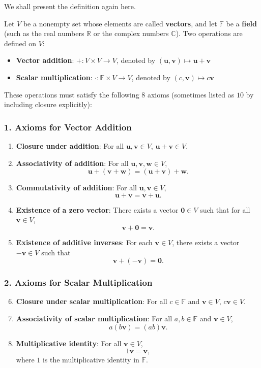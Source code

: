 We shall present the definition again here.

Let $V$ be a nonempty set whose elements are called \textbf{vectors}, and let $\mathbb{F}$ be a \textbf{field} (such as the real numbers $\mathbb{R}$ or the complex numbers $\mathbb{C}$). Two operations are defined on $V$:

\begin{itemize}
    \item \textbf{Vector addition}: $+ : V \times V \to V$, denoted by $(\mathbf{u}, \mathbf{v}) \mapsto \mathbf{u} + \mathbf{v}$
    \item \textbf{Scalar multiplication}: $\cdot : \mathbb{F} \times V \to V$, denoted by $(c, \mathbf{v}) \mapsto c \mathbf{v}$
\end{itemize}

These operations must satisfy the following $8$ axioms (sometimes listed as $10$ by including closure explicitly):

\subsubsection*{1. Axioms for Vector Addition}
\begin{enumerate}
    \item \textbf{Closure under addition}: For all $\mathbf{u}, \mathbf{v} \in V$, $\mathbf{u} + \mathbf{v} \in V$.
    \item \textbf{Associativity of addition}: For all $\mathbf{u}, \mathbf{v}, \mathbf{w} \in V$,
    \[
    \mathbf{u} + (\mathbf{v} + \mathbf{w}) = (\mathbf{u} + \mathbf{v}) + \mathbf{w}.
    \]
    \item \textbf{Commutativity of addition}: For all $\mathbf{u}, \mathbf{v} \in V$,
    \[
    \mathbf{u} + \mathbf{v} = \mathbf{v} + \mathbf{u}.
    \]
    \item \textbf{Existence of a zero vector}: There exists a vector $\mathbf{0} \in V$ such that for all $\mathbf{v} \in V$,
    \[
    \mathbf{v} + \mathbf{0} = \mathbf{v}.
    \]
    \item \textbf{Existence of additive inverses}: For each $\mathbf{v} \in V$, there exists a vector $-\mathbf{v} \in V$ such that
    \[
    \mathbf{v} + (-\mathbf{v}) = \mathbf{0}.
    \]
\end{enumerate}

\subsubsection*{2. Axioms for Scalar Multiplication}
\begin{enumerate}
    \setcounter{enumi}{5}
    \item \textbf{Closure under scalar multiplication}: For all $c \in \mathbb{F}$ and $\mathbf{v} \in V$, $c \mathbf{v} \in V$.
    \item \textbf{Associativity of scalar multiplication}: For all $a, b \in \mathbb{F}$ and $\mathbf{v} \in V$,
    \[
    a (b \mathbf{v}) = (ab) \mathbf{v}.
    \]
    \item \textbf{Multiplicative identity}: For all $\mathbf{v} \in V$,
    \[
    1 \mathbf{v} = \mathbf{v},
    \]
    where $1$ is the multiplicative identity in $\mathbb{F}$.
\end{enumerate}

